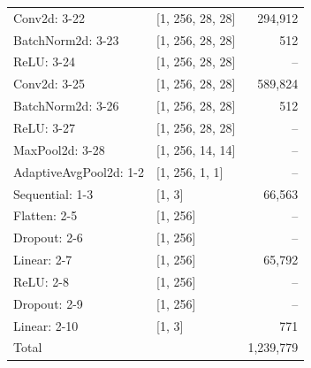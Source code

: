 \begin{table}[htbp]
\begin{tabular}{llr}
Conv2d: 3-22 & [1, 256, 28, 28] & 294,912 \\
BatchNorm2d: 3-23 & [1, 256, 28, 28] & 512 \\
ReLU: 3-24 & [1, 256, 28, 28] & -- \\
Conv2d: 3-25 & [1, 256, 28, 28] & 589,824 \\
BatchNorm2d: 3-26 & [1, 256, 28, 28] & 512 \\
ReLU: 3-27 & [1, 256, 28, 28] & -- \\
MaxPool2d: 3-28 & [1, 256, 14, 14] & -- \\
AdaptiveAvgPool2d: 1-2 & [1, 256, 1, 1] & -- \\
Sequential: 1-3 & [1, 3] & 66,563 \\
Flatten: 2-5 & [1, 256] & -- \\
Dropout: 2-6 & [1, 256] & -- \\
Linear: 2-7 & [1, 256] & 65,792 \\
ReLU: 2-8 & [1, 256] & -- \\
Dropout: 2-9 & [1, 256] & -- \\
Linear: 2-10 & [1, 3] & 771 \\
\hline
Total & & 1,239,779 \\
\hline
\end{tabular}
\end{table}
